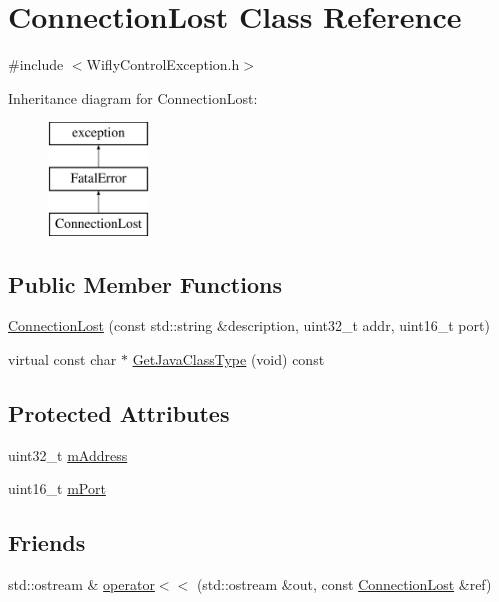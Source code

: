 \hypertarget{class_connection_lost}{\section{Connection\-Lost Class Reference}
\label{class_connection_lost}
}


{\ttfamily \#include $<$Wifly\-Control\-Exception.\-h$>$}

Inheritance diagram for Connection\-Lost\-:\begin{figure}[H]
\begin{center}
\leavevmode
\includegraphics[height=3.000000cm]{class_connection_lost}
\end{center}
\end{figure}
\subsection*{Public Member Functions}
\begin{DoxyCompactItemize}
\item 
\hyperlink{class_connection_lost_a15f607235fc900c1fd5b5da0de1e5789}{Connection\-Lost} (const std\-::string \&description, uint32\-\_\-t addr, uint16\-\_\-t port)
\item 
virtual const char $\ast$ \hyperlink{class_connection_lost_a2eb654e91bef98e581f7e20a6a161d3b}{Get\-Java\-Class\-Type} (void) const 
\end{DoxyCompactItemize}
\subsection*{Protected Attributes}
\begin{DoxyCompactItemize}
\item 
uint32\-\_\-t \hyperlink{class_connection_lost_acc7902004c6fe371cf55b4dd6366c64c}{m\-Address}
\item 
uint16\-\_\-t \hyperlink{class_connection_lost_a8b05ac061a6d77c326cb261aa1fc93ab}{m\-Port}
\end{DoxyCompactItemize}
\subsection*{Friends}
\begin{DoxyCompactItemize}
\item 
std\-::ostream \& \hyperlink{class_connection_lost_a6a1446a3968cd20190989430f0f441c6}{operator$<$$<$} (std\-::ostream \&out, const \hyperlink{class_connection_lost}{Connection\-Lost} \&ref)
\end{DoxyCompactItemize}


